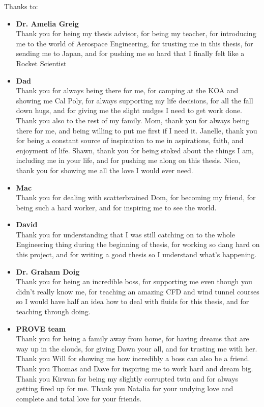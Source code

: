 \noindent
Thanks to:
\begin{itemize}
    \item \textbf{Dr. Amelia Greig} \\
    Thank you for being my thesis advisor, for being my teacher, for introducing me to the world of Aerospace Engineering, for trusting me in this thesis, for sending me to Japan, and for pushing me so hard that I finally felt like a Rocket Scientist
    \item \textbf{Dad} \\
    Thank you for always being there for me, for camping at the KOA and showing me Cal Poly, for always supporting my life decisions, for all the fall down hugs, and for giving me the slight nudges I need to get work done. Thank you also to the rest of my family. Mom, thank you for always being there for me, and being willing to put me first if I need it. Janelle, thank you for being a constant source of inspiration to me in aspirations, faith, and enjoyment of life. Shawn, thank you for being stoked about the things I am, including me in your life, and for pushing me along on this thesis. Nico, thank you for showing me all the love I would ever need.
    \item \textbf{Mac} \\
    Thank you for dealing with scatterbrained Dom, for becoming my friend, for being such a hard worker, and for inspiring me to see the world.
    \item \textbf{David}\\
    Thank you for understanding that I was still catching on to the whole Engineering thing during the beginning of thesis, for working so dang hard on this project, and for writing a good thesis so I understand what's happening. 
    \item  \textbf{Dr. Graham Doig}\\
    Thank you for being an incredible boss, for supporting me even though you didn't really know me, for teaching an amazing CFD and wind tunnel courses so I would have half an idea how to deal with fluids for this thesis, and for teaching through doing.
    \item \textbf{PROVE team}\\
    Thank you for being a family away from home, for having dreams that are way up in the clouds, for giving Dawn your all, and for trusting me with her. Thank you Will for showing me how incredibly a boss can also be a friend. Thank you Thomas and Dave for inspiring me to work hard and dream big. Thank you Kirwan for being my slightly corrupted twin and for always getting fired up for me. Thank you Natalia for your undying love and complete and total love for your friends.

\end{itemize}
